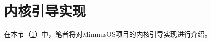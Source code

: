 \section{内核引导实现}\label{sec:KernelBootImplementation}

在本节（\cref{sec:KernelBootImplementation}）中，笔者将对MinmusOS项目的内核引导实现进行介绍。